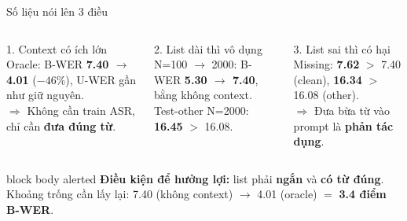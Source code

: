\documentclass[aspectratio=169,xcolor=table]{beamer}
\newcommand{\bad}[1]{\textcolor{RiskRed}{\textbf{#1}}}
\begin{document}
\begin{frame}{Số liệu nói lên 3 điều}
\begin{columns}[T,onlytextwidth]
\begin{block}{1. Context có ích lớn}
\small Oracle: B-WER \textbf{7.40 $\rightarrow$ 4.01} ($-46\%$), U-WER gần như giữ nguyên.\\[3pt]
$\Rightarrow$ Không cần train ASR, chỉ cần \textbf{đưa đúng từ}.
\end{block}
\begin{alertblock}{2. List dài thì vô dụng}
\small N=100 $\rightarrow$ 2000: B-WER \textbf{5.30 $\rightarrow$ 7.40}, bằng không context.\\[3pt]
Test-other N=2000: \bad{16.45} $>$ 16.08.
\end{alertblock}
\begin{alertblock}{3. List sai thì có hại}
\small Missing: \bad{7.62} $>$ 7.40 (clean), \bad{16.34} $>$ 16.08 (other).\\[3pt]
$\Rightarrow$ Đưa bừa từ vào prompt là \textbf{phản tác dụng}.
\end{alertblock}
\end{columns}
\vspace{0.4cm}
\begin{beamercolorbox}[sep=0.55em,center,rounded=true]{block body alerted}
\textbf{Điều kiện để hưởng lợi:} list phải \textbf{ngắn} và \textbf{có từ đúng}.\\
\small Khoảng trống cần lấy lại: 7.40 (không context) $\rightarrow$ 4.01 (oracle) $=$ \textbf{3.4 điểm B-WER}.
\end{beamercolorbox}
\end{frame}

\end{document}
